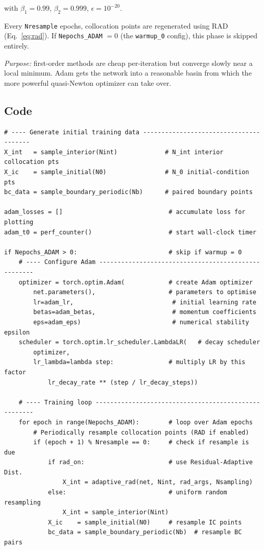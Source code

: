 \documentclass[11pt,a4paper]{article}
\begin{document}
with $\beta_1 = 0.99$, $\beta_2 = 0.999$, $\epsilon = 10^{-20}$.

Every \texttt{Nresample} epochs, collocation points are regenerated
using RAD (Eq.~\eqref{eq:rad}).  If \texttt{Nepochs\_ADAM} $= 0$
(the \texttt{warmup\_0} config), this phase is skipped entirely.

\emph{Purpose:} first-order methods are cheap per-iteration but
converge slowly near a local minimum.  Adam gets the network into a
reasonable basin from which the more powerful quasi-Newton optimizer
can take over.

\subsection*{Code}

\begin{lstlisting}
# ---- Generate initial training data ---------------------------------------
X_int   = sample_interior(Nint)             # N_int interior collocation pts
X_ic    = sample_initial(N0)                # N_0 initial-condition pts
bc_data = sample_boundary_periodic(Nb)      # paired boundary points

adam_losses = []                             # accumulate loss for plotting
adam_t0 = perf_counter()                     # start wall-clock timer

if Nepochs_ADAM > 0:                         # skip if warmup = 0
    # ---- Configure Adam ----------------------------------------------------
    optimizer = torch.optim.Adam(            # create Adam optimizer
        net.parameters(),                    # parameters to optimise
        lr=adam_lr,                           # initial learning rate
        betas=adam_betas,                     # momentum coefficients
        eps=adam_eps)                         # numerical stability epsilon
    scheduler = torch.optim.lr_scheduler.LambdaLR(   # decay scheduler
        optimizer,
        lr_lambda=lambda step:               # multiply LR by this factor
            lr_decay_rate ** (step / lr_decay_steps))

    # ---- Training loop -----------------------------------------------------
    for epoch in range(Nepochs_ADAM):        # loop over Adam epochs
        # Periodically resample collocation points (RAD if enabled)
        if (epoch + 1) % Nresample == 0:     # check if resample is due
            if rad_on:                       # use Residual-Adaptive Dist.
                X_int = adaptive_rad(net, Nint, rad_args, Nsampling)
            else:                            # uniform random resampling
                X_int = sample_interior(Nint)
            X_ic    = sample_initial(N0)     # resample IC points
            bc_data = sample_boundary_periodic(Nb)  # resample BC pairs


\end{lstlisting}
\end{document}
